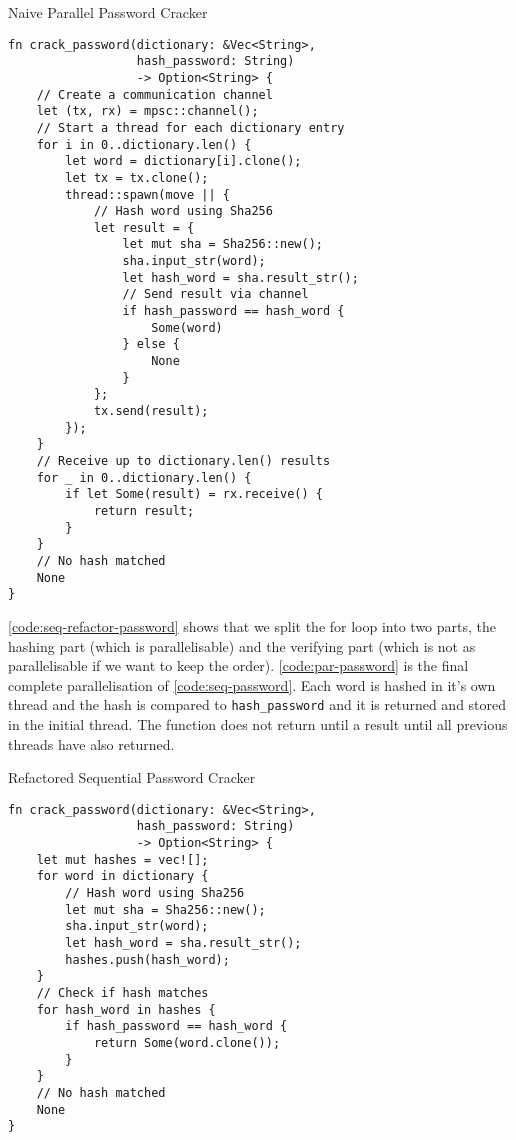 \documentclass[conference]{IEEEtran}
\begin{document}
\begin{algorithm}
\caption{Naive Parallel Password Cracker}
\label{code:par-naive-password}
\begin{verbatim}
fn crack_password(dictionary: &Vec<String>,
                  hash_password: String)
                  -> Option<String> {
    // Create a communication channel
    let (tx, rx) = mpsc::channel();
    // Start a thread for each dictionary entry
    for i in 0..dictionary.len() {
        let word = dictionary[i].clone();
        let tx = tx.clone();
        thread::spawn(move || {
            // Hash word using Sha256
            let result = {
                let mut sha = Sha256::new();
                sha.input_str(word);
                let hash_word = sha.result_str();
                // Send result via channel
                if hash_password == hash_word {
                    Some(word)
                } else {
                    None
                }
            };
            tx.send(result);
        });
    }
    // Receive up to dictionary.len() results
    for _ in 0..dictionary.len() {
        if let Some(result) = rx.receive() {
            return result;
        }
    }
    // No hash matched
    None
}
\end{verbatim}
\end{algorithm}

\autoref{code:seq-refactor-password} shows that we split the for loop into two parts, the hashing part (which is parallelisable) and the verifying part (which is not as parallelisable if we want to keep the order). \autoref{code:par-password} is the final complete parallelisation of \autoref{code:seq-password}. Each word is hashed in it's own thread and the hash is compared to \texttt{hash\_password} and it is returned and stored in the initial thread. The function does not return until a result until all previous threads have also returned.

\begin{algorithm}
\caption{Refactored Sequential Password Cracker}
\label{code:seq-refactor-password}
\begin{verbatim}
fn crack_password(dictionary: &Vec<String>,
                  hash_password: String)
                  -> Option<String> {
    let mut hashes = vec![];
    for word in dictionary {
        // Hash word using Sha256
        let mut sha = Sha256::new();
        sha.input_str(word);
        let hash_word = sha.result_str();
        hashes.push(hash_word);
    }
    // Check if hash matches
    for hash_word in hashes {
        if hash_password == hash_word {
            return Some(word.clone());
        }
    }
    // No hash matched
    None
}
\end{verbatim}
\end{algorithm}
\end{document}
